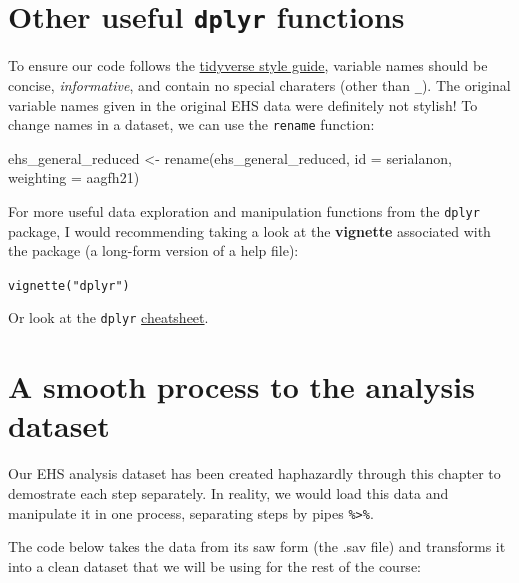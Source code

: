 \documentclass[
  letterpaper,
  DIV=11,
  numbers=noendperiod]{scrreprt}
\newenvironment{Shaded}{\begin{snugshade}}{\end{snugshade}}
\newcommand{\AttributeTok}[1]{\textcolor[rgb]{0.40,0.45,0.13}{#1}}
\newcommand{\FunctionTok}[1]{\textcolor[rgb]{0.28,0.35,0.67}{#1}}
\newcommand{\NormalTok}[1]{\textcolor[rgb]{0.00,0.23,0.31}{#1}}
\newcommand{\OtherTok}[1]{\textcolor[rgb]{0.00,0.23,0.31}{#1}}
\begin{document}
\section{\texorpdfstring{Other useful \texttt{dplyr}
functions}{Other useful dplyr functions}}\label{other-useful-dplyr-functions}

To ensure our code follows the
\href{https://style.tidyverse.org/}{tidyverse style guide}, variable
names should be concise, \emph{informative}, and contain no special
charaters (other than \texttt{\_}). The original variable names given in
the original EHS data were definitely not stylish! To change names in a
dataset, we can use the \texttt{rename} function:

\begin{Shaded}
\begin{Highlighting}[]
\NormalTok{ehs\_general\_reduced }\OtherTok{\textless{}{-}} \FunctionTok{rename}\NormalTok{(ehs\_general\_reduced,}
                              \AttributeTok{id =}\NormalTok{ serialanon,}
                              \AttributeTok{weighting =}\NormalTok{ aagfh21)}
\end{Highlighting}
\end{Shaded}

For more useful data exploration and manipulation functions from the
\texttt{dplyr} package, I would recommending taking a look at the
\textbf{vignette} associated with the package (a long-form version of a
help file):

\texttt{vignette("dplyr")}

Or look at the \texttt{dplyr}
\href{https://rstudio.github.io/cheatsheets/data-transformation.pdf}{cheatsheet}.

\section{A smooth process to the analysis
dataset}\label{a-smooth-process-to-the-analysis-dataset}

Our EHS analysis dataset has been created haphazardly through this
chapter to demostrate each step separately. In reality, we would load
this data and manipulate it in one process, separating steps by pipes
\texttt{\%\textgreater{}\%}.

The code below takes the data from its saw form (the .sav file) and
transforms it into a clean dataset that we will be using for the rest of
the course:
\end{document}
